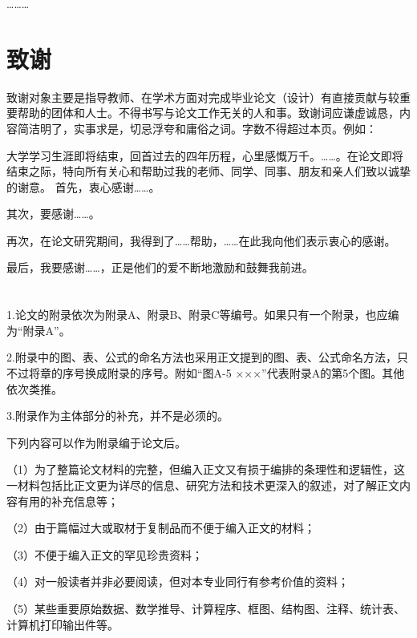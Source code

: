 \documentclass{QITthesis}
\begin{document}
\dots\dots\dots

\nocite{*}
\printbibliography

\section{致\hspace{.5\ccwd}谢}

致谢对象主要是指导教师、在学术方面对完成毕业论文（设计）有直接贡献与较重要帮助的团体和人士。不得书写与论文工作无关的人和事。致谢词应谦虚诚恳，内容简洁明了，实事求是，切忌浮夸和庸俗之词。字数不得超过本页。例如：

大学学习生涯即将结束，回首过去的四年历程，心里感慨万千。\dots\dots。在论文即将结束之际，特向所有关心和帮助过我的老师、同学、同事、朋友和亲人们致以诚挚的谢意。
首先，衷心感谢\dots\dots。

其次，要感谢\dots\dots。

再次，在论文研究期间，我得到了\dots\dots 帮助，\dots\dots 在此我向他们表示衷心的感谢。

最后，我要感谢\dots\dots，正是他们的爱不断地激励和鼓舞我前进。

\appendix

\section{}

1.论文的附录依次为附录A、附录B、附录C等编号。如果只有一个附录，也应编为“附录A”。

2.附录中的图、表、公式的命名方法也采用正文提到的图、表、公式命名方法，只不过将章的序号换成附录的序号。附如“图A-5 ×××”代表附录A的第5个图。其他依次类推。

3.附录作为主体部分的补充，并不是必须的。

下列内容可以作为附录编于论文后。

（1）为了整篇论文材料的完整，但编入正文又有损于编排的条理性和逻辑性，这一材料包括比正文更为详尽的信息、研究方法和技术更深入的叙述，对了解正文内容有用的补充信息等；

（2）由于篇幅过大或取材于复制品而不便于编入正文的材料；

（3）不便于编入正文的罕见珍贵资料；

（4）对一般读者并非必要阅读，但对本专业同行有参考价值的资料；

（5）某些重要原始数据、数学推导、计算程序、框图、结构图、注释、统计表、计算机打印输出件等。
\end{document}
